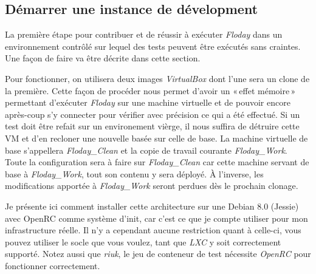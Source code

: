 \subsection{Démarrer une instance de dévelopment}

La première étape pour contribuer et de réussir à exécuter \emph{Floday} dans un environnement contrôlé sur lequel des tests peuvent être exécutés sans craintes.
Une façon de faire va être décrite dans cette section.

Pour fonctionner, on utilisera deux images \emph{VirtualBox} dont l'une sera un clone de la première.
Cette façon de procéder nous permet d'avoir un «\,effet mémoire\,» permettant d'exécuter \emph{Floday} sur une machine virtuelle et de pouvoir encore après-coup s'y connecter pour vérifier avec précision ce qui a été effectué.
Si un test doit être refait sur un environement vièrge, il nous suffira de détruire cette VM et d'en recloner une nouvelle basée sur celle de base.
La machine virtuelle de base s'appellera \emph{Floday\_Clean} et la copie de travail courante \emph{Floday\_Work}.
Toute la configuration sera à faire sur \emph{Floday\_Clean} car cette machine servant de base à \emph{Floday\_Work}, tout son contenu y sera déployé.
À l'inverse, les modifications apportée à \emph{Floday\_Work} seront perdues dès le prochain clonage.

Je présente ici comment installer cette architecture sur une Debian 8.0 (Jessie) avec OpenRC comme système d'init, car c'est ce que je compte utiliser pour mon infrastructure réelle.
Il n'y a cependant aucune restriction quant à celle-ci, vous pouvez utiliser le socle que vous voulez, tant que \emph{LXC} y soit correctement supporté.
Notez aussi que \emph{riuk}, le jeu de conteneur de test nécessite \emph{OpenRC} pour fonctionner correctement.

